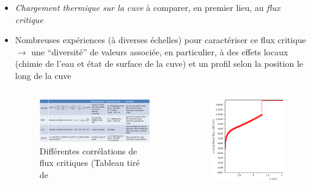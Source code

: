 \begin{frame}[fragile]
\begin{itemize}
\item \emph{Chargement thermique sur la cuve} à comparer, en premier lieu, au \emph{flux critique}
\item Nombreuses expériences (à diverses échelles) pour caractériser ce flux critique \\ $\rightarrow$ une ``diversité'' de valeurs associée, en particulier, à des effets locaux (chimie de l'eau et état de surface de la cuve) et un profil selon la position le long de la cuve
\begin{columns}
\begin{column}{0.75\textwidth}
\begin{figure}[H]
\centering \includegraphics[width=1.0\textwidth]{Figures/Tab_Atkhen2020.png}
\caption{\tiny Différentes corrélations de flux critiques (Tableau tiré de \cite{Atkhen2020}}
\end{figure}
\end{column}
\begin{column}{0.25\textwidth}
\begin{figure}[H]
\centering \includegraphics[width=1.0\textwidth]{Figures/ulpu.eps}

\end{figure}
\end{column}
\end{columns}
\end{itemize}
\end{frame}
